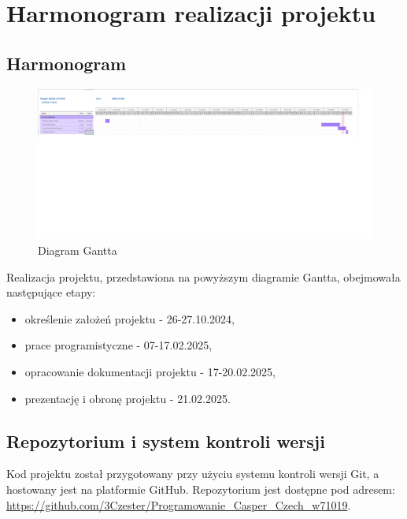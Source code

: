 ﻿%
\chapter{Harmonogram realizacji projektu}

\section{Harmonogram}
\begin{figure}[ht]
    \centering
    \includegraphics[width=1\linewidth]{harmonogram.jpg}
    \caption{Diagram Gantta}
\end{figure}
Realizacja projektu, przedstawiona na powyższym diagramie Gantta, obejmowała następujące etapy:
\begin{itemize}
    \item określenie założeń projektu - 26-27.10.2024,
    \item prace programistyczne - 07-17.02.2025,
    \item opracowanie dokumentacji projektu - 17-20.02.2025,
    \item prezentację i obronę projektu - 21.02.2025.
\end{itemize}

\section{Repozytorium i system kontroli wersji}
Kod projektu został przygotowany przy użyciu systemu kontroli wersji Git, a hostowany jest na platformie GitHub.
Repozytorium jest dostępne pod adresem: \url{https://github.com/3Czester/Programowanie_Casper_Czech_w71019}.


